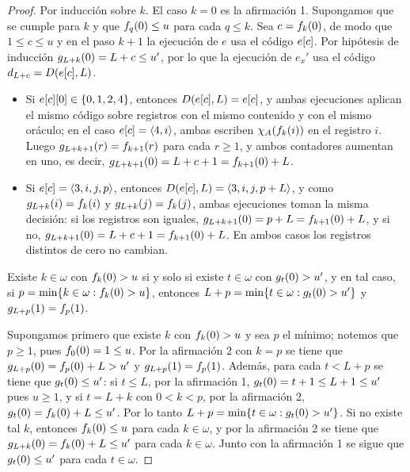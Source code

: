 \begin{agregado}
\begin{agregado}
\begin{correccion}
\begin{proof}
	Por inducción sobre $k$. El caso $k = 0$ es la afirmación 1. Supongamos que se cumple para $k$ y que $f_{q}\pa*{0}\leq u$ para cada $q\leq k$. Sea $c = f_{k}\pa*{0}$, de modo que $1\leq c\leq u$ y en el paso $k + 1$ la ejecución de $e$ usa el código $e\bra*{c}$. Por hipótesis de inducción $g_{L + k}\pa*{0} = L + c\leq u'$, por lo que la ejecución de $e_{x}'$ usa el código $d_{L + c} = D\pa*{e\bra*{c}, L}$.
	\begin{itemize}
		\item Si $e\bra*{c}\bra*{0}\in\set*{0, 1, 2, 4}$, entonces $D\pa*{e\bra*{c}, L} = e\bra*{c}$, y ambas ejecuciones aplican el mismo código sobre registros con el mismo contenido y con el mismo oráculo; en el caso $e\bra*{c} =\inner*{4, i}$, ambas escriben $\CARACTERISTICA{A}\pa*{f_{k}\pa*{i}}$ en el registro $i$. Luego $g_{L + k + 1}\pa*{r} = f_{k + 1}\pa*{r}$ para cada $r\geq 1$, y ambos contadores aumentan en uno, es decir, $g_{L + k + 1}\pa*{0} = L + c + 1 = f_{k + 1}\pa*{0} + L$.
		\item Si $e\bra*{c} =\inner*{3, i, j, p}$, entonces $D\pa*{e\bra*{c}, L} =\inner*{3, i, j, p + L}$, y como $g_{L + k}\pa*{i} = f_{k}\pa*{i}$ y $g_{L + k}\pa*{j} = f_{k}\pa*{j}$, ambas ejecuciones toman la misma decisión: si los registros son iguales, $g_{L + k + 1}\pa*{0} = p + L = f_{k + 1}\pa*{0} + L$, y si no, $g_{L + k + 1}\pa*{0} = L + c + 1 = f_{k + 1}\pa*{0} + L$. En ambos casos los registros distintos de cero no cambian.
	\end{itemize}

	Existe $k\in\omega$ con $f_{k}\pa*{0} > u$ si y solo si existe $t\in\omega$ con $g_{t}\pa*{0} > u'$, y en tal caso, si $p =\min\set*{k\in\omega: f_{k}\pa*{0} > u}$, entonces $L + p =\min\set*{t\in\omega: g_{t}\pa*{0} > u'}$ y $g_{L + p}\pa*{1} = f_{p}\pa*{1}$.

	Supongamos primero que existe $k$ con $f_{k}\pa*{0} > u$ y sea $p$ el mínimo; notemos que $p\geq 1$, pues $f_{0}\pa*{0} = 1\leq u$. Por la afirmación 2 con $k = p$ se tiene que $g_{L + p}\pa*{0} = f_{p}\pa*{0} + L > u'$ y $g_{L + p}\pa*{1} = f_{p}\pa*{1}$. Además, para cada $t < L + p$ se tiene que $g_{t}\pa*{0}\leq u'$: si $t\leq L$, por la afirmación 1, $g_{t}\pa*{0} = t + 1\leq L + 1\leq u'$ pues $u\geq 1$, y si $t = L + k$ con $0 < k < p$, por la afirmación 2, $g_{t}\pa*{0} = f_{k}\pa*{0} + L\leq u'$. Por lo tanto $L + p =\min\set*{t\in\omega: g_{t}\pa*{0} > u'}$. Si no existe tal $k$, entonces $f_{k}\pa*{0}\leq u$ para cada $k\in\omega$, y por la afirmación 2 se tiene que $g_{L + k}\pa*{0} = f_{k}\pa*{0} + L\leq u'$ para cada $k\in\omega$. Junto con la afirmación 1 se sigue que $g_{t}\pa*{0}\leq u'$ para cada $t\in\omega$.


\end{proof}
\end{correccion}
\end{agregado}
\end{agregado}
